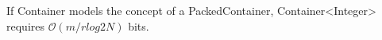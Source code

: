\documentclass[ ../main.tex]{subfiles}
\begin{document}
%	
%
%
%
%
%





If Container models the concept of a PackedContainer, Container<Integer> requires $\mathcal{O}(m/r log2 N)$ bits.
\end{document}
